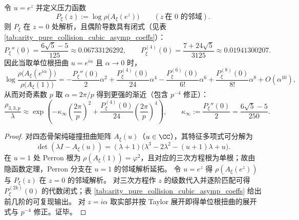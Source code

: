 \begin{proposition}\label{prop:arity-collision-quadratic-closed}
令 \(u=e^{z}\) 并定义压力函数
$$
P_\xi(z):=\log\rho\bigl(A_\xi(e^{z})\bigr)\qquad(z\ \text{在 }0\text{ 的邻域}).
$$
则 \(P_\xi\) 在 \(z=0\) 处解析，且偶阶导数具有闭式（见表 \ref{tab:arity_pure_collision_cubic_asymp_coeffs}）：
$$
P_\xi''(0)=\frac{6\sqrt5-5}{125}\approx 0.06733126292,
\qquad
P_\xi^{(4)}(0)=\frac{7+24\sqrt5}{3125}\approx 0.01941300207.
$$
因此当取单位根扭曲 \(u=e^{i\alpha}\) 且 \(\alpha\to 0\) 时，
$$
\log\frac{\rho\bigl(A_\xi(e^{i\alpha})\bigr)}{\rho\bigl(A_\xi(1)\bigr)}
=-\frac{P_\xi''(0)}{2}\alpha^2+\frac{P_\xi^{(4)}(0)}{24}\alpha^4-\frac{P_\xi^{(6)}(0)}{6!}\alpha^6+\frac{P_\xi^{(8)}(0)}{8!}\alpha^8+O(\alpha^{10}),
$$
从而对奇素数 \(p\) 取 \(\alpha=2\pi/p\) 得到更强的渐近（包含 \(p^{-4}\) 修正）：
$$
\frac{\rho_{3,3,p}}{\lambda}
\approx
\exp\!\left(
-\kappa_\infty\left(\frac{2\pi}{p}\right)^2+\frac{P_\xi^{(4)}(0)}{24}\left(\frac{2\pi}{p}\right)^4
\right),
\qquad
\kappa_\infty:=\frac{P_\xi''(0)}{2}=\frac{6\sqrt5-5}{250}.
$$
\end{proposition}

\begin{proof}
对四态骨架纯碰撞扭曲矩阵 \(A_\xi(u)\)（\(u\in\CC\)），其特征多项式可分解为
$$
\det(\lambda I-A_\xi(u))=(\lambda+1)\bigl(\lambda^3-2\lambda^2-(u+1)\lambda+u\bigr).
$$
在 \(u=1\) 处 Perron 根为 \(\rho(A_\xi(1))=\varphi^2\)，且对应的三次方程根为单根；故由隐函数定理，Perron 分支在 \(u=1\) 的邻域解析延拓。
令 \(u=e^z\) 得 \(\rho(A_\xi(e^z))\) 与 \(P_\xi(z)\) 在 \(z=0\) 的邻域解析。
对三次方程作 \(z\) 的级数代入并逐阶匹配可得 \(P_\xi^{(2k)}(0)\) 的代数闭式；表 \ref{tab:arity_pure_collision_cubic_asymp_coeffs} 给出前几阶的可复现输出。
对 \(z=i\alpha\) 取实部并按 Taylor 展开即得单位根扭曲的展开式与 \(p^{-4}\) 修正。证毕。
\end{proof}

